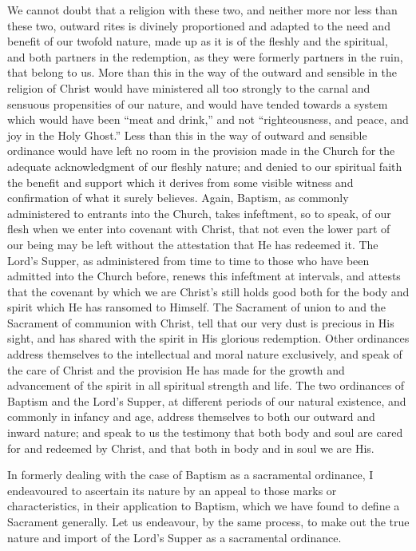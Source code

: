 \documentclass[
  english,
]{book}
\begin{document}
We cannot doubt that a religion with these two, and neither more nor less than these two, outward rites is divinely proportioned and adapted to the need and benefit of our twofold nature, made up as it is of the fleshly and the spiritual, and both partners in the redemption, as they were formerly partners in the ruin, that belong to us. More than this in the way of the outward and sensible in the religion of Christ would have ministered all too strongly to the carnal and sensuous propensities of our nature, and would have tended towards a system which would have been ``meat and drink,'' and not ``righteousness, and peace, and joy in the Holy Ghost.'' Less than this in the way of outward and sensible ordinance would have left no room in the provision made in the Church for the adequate acknowledgment of our fleshly nature; and denied to our spiritual faith the benefit and support which it derives from some visible witness and confirmation of what it surely believes. Again, Baptism, as commonly administered to entrants into the Church, takes infeftment, so to speak, of our flesh when we enter into covenant with Christ, that not even the lower part of our being may be left without the attestation that He has redeemed it. The Lord's Supper, as administered from time to time to those who have been admitted into the Church before, renews this infeftment at intervals, and attests that the covenant by which we are Christ's still holds good both for the body and spirit which He has ransomed to Himself. The Sacrament of union to and the Sacrament of communion with Christ, tell that our very dust is precious in His sight, and has shared with the spirit in His glorious redemption. Other ordinances address themselves to the intellectual and moral nature exclusively, and speak of the care of Christ and the provision He has made for the growth and advancement of the spirit in all spiritual strength and life. The two ordinances of Baptism and the Lord's Supper, at different periods of our natural existence, and commonly in infancy and age, address themselves to both our outward and inward nature; and speak to us the testimony that both body and soul are cared for and redeemed by Christ, and that both in body and in soul we are His.

In formerly dealing with the case of Baptism as a sacramental ordinance, I endeavoured to ascertain its nature by an appeal to those marks or characteristics, in their application to Baptism, which we have found to define a Sacrament generally. Let us endeavour, by the same process, to make out the true nature and import of the Lord's Supper as a sacramental ordinance.
\end{document}
